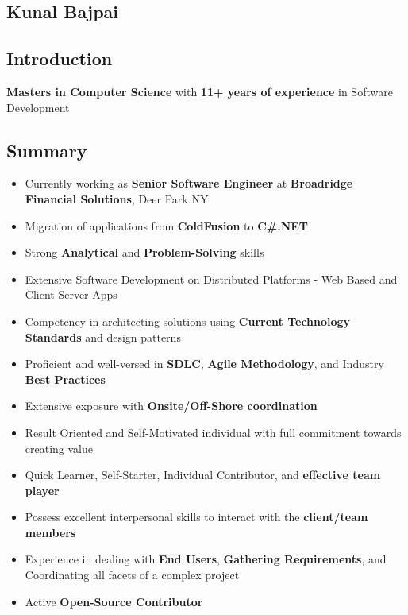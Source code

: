 \documentclass[letterpaper,11pt]{article}
\begin{document}
\begin{center}
\section{Kunal Bajpai}
\end{center}

\subsection{Introduction}
\textbf{Masters in Computer Science} with \textbf{11+ years of experience} in Software Development

\subsection{Summary}
\begin{itemize}
    \item Currently working as \textbf{Senior Software Engineer} at \textbf{Broadridge Financial Solutions}, Deer Park NY
    \item Migration of applications from \textbf{ColdFusion} to \textbf{C\#.NET}
    \item Strong \textbf{Analytical} and \textbf{Problem-Solving} skills
    \item Extensive Software Development on Distributed Platforms - Web Based and Client Server Apps
    \item Competency in architecting solutions using \textbf{Current Technology Standards} and design patterns
    \item Proficient and well-versed in \textbf{SDLC}, \textbf{Agile Methodology}, and Industry \textbf{Best Practices}
    \item Extensive exposure with \textbf{Onsite/Off-Shore coordination}
    \item Result Oriented and Self-Motivated individual with full commitment towards creating value
    \item Quick Learner, Self-Starter, Individual Contributor, and \textbf{effective team player}
    \item Possess excellent interpersonal skills to interact with the \textbf{client/team members}
    \item Experience in dealing with \textbf{End Users}, \textbf{Gathering Requirements}, and Coordinating all facets of a complex project
    \item Active \textbf{Open-Source Contributor}
\end{itemize}
\end{document}
